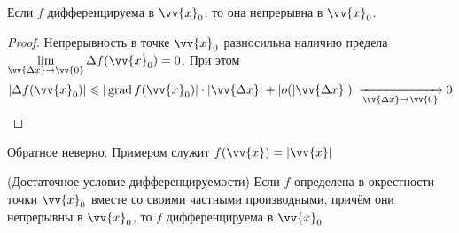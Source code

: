 \begin{theorem}
	Если $f$ дифференцируема в $\vv{x}_0$, то она непрерывна в $\vv{x}_0$.
\end{theorem}

\begin{proof}
	Непрерывность в точке $\vv{x}_0$ равносильна наличию предела $\liml_{\vv{\Delta x} \to \vv{0}} \Delta f(\vv{x}_0) = 0$. При этом
	\[
		|\Delta f(\vv{x}_0)| \le |\grad f(\vv{x}_0)| \cdot |\vv{\Delta x}| + |o(|\vv{\Delta x}|)| \xrightarrow[\vv{\Delta x} \to \vv{0}]{} 0
	\]
\end{proof}

\begin{example}
	Обратное неверно. Примером служит $f(\vv{x}) = |\vv{x}|$
\end{example}

\begin{theorem} (Достаточное условие дифференцируемости)
	Если $f$ определена в окрестности точки $\vv{x}_0$ вместе со своими частными производными, причём они непрерывны в $\vv{x}_0$, то $f$ дифференцируема в $\vv{x}_0$
\end{theorem}

